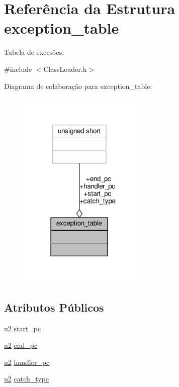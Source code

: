 \hypertarget{structexception__table}{}\section{Referência da Estrutura exception\+\_\+table}
\label{structexception__table}


Tabela de excesões.  




{\ttfamily \#include $<$Class\+Loader.\+h$>$}



Diagrama de colaboração para exception\+\_\+table\+:\nopagebreak
\begin{figure}[H]
\begin{center}
\leavevmode
\includegraphics[width=178pt]{structexception__table__coll__graph}
\end{center}
\end{figure}
\subsection*{Atributos Públicos}
\begin{DoxyCompactItemize}
\item 
\hyperlink{ClassLoader_8h_a5f223212eef04d10a4550ded680cb1cf}{u2} \hyperlink{structexception__table_a63da93a2b0f5dc61b3a158a0c7384602}{start\+\_\+pc}
\item 
\hyperlink{ClassLoader_8h_a5f223212eef04d10a4550ded680cb1cf}{u2} \hyperlink{structexception__table_aeb4c86c92f02d6fccd52a0a9be9c5dac}{end\+\_\+pc}
\item 
\hyperlink{ClassLoader_8h_a5f223212eef04d10a4550ded680cb1cf}{u2} \hyperlink{structexception__table_a8fe6fb5063598ad0d48aab5e617d6a35}{handler\+\_\+pc}
\item 
\hyperlink{ClassLoader_8h_a5f223212eef04d10a4550ded680cb1cf}{u2} \hyperlink{structexception__table_ade50b30a987f3d3452a6de69eee0ada5}{catch\+\_\+type}
\end{DoxyCompactItemize}


